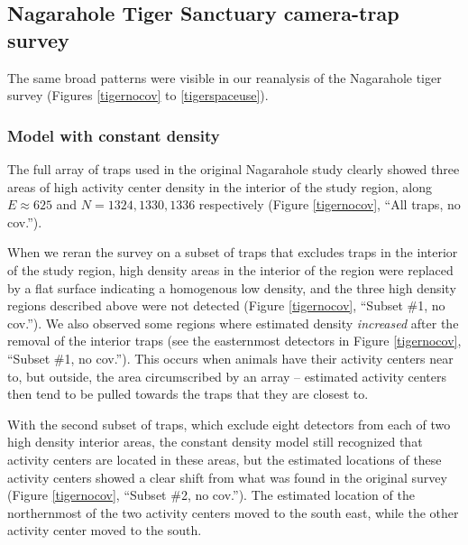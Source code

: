 \documentclass[a4paper,12pt]{article}
\begin{document}
\subsection{Nagarahole Tiger Sanctuary camera-trap survey} 
The same broad patterns were visible in our reanalysis of the Nagarahole tiger survey (Figures \ref{tigernocov} to \ref{tigerspaceuse}). 

\subsubsection{Model with constant density}
The full array of traps used in the original Nagarahole study clearly showed three areas of high activity center density in the interior of the study region, along $E\approx 625$ and $N=1324, 1330, 1336$ respectively (Figure \ref{tigernocov}, ``All traps, no cov.''). 

When we reran the survey on a subset of traps that excludes traps in the interior of the study region, high density areas in the interior of the region were replaced by a flat surface indicating a homogenous low density, and the three high density regions described above were not detected  (Figure \ref{tigernocov}, ``Subset \#1, no cov.''). We also observed some regions where estimated density {\it increased} after the removal of the interior traps (see the easternmost detectors in Figure \ref{tigernocov}, ``Subset \#1, no cov.''). This occurs when animals have their activity centers near to, but outside, the area circumscribed by an array -- estimated activity centers then tend to be pulled towards the traps that they are closest to. 

With the second subset of traps, which exclude eight detectors from each of two high density interior areas, the constant density model still recognized that activity centers are located in these areas, but the estimated locations of these activity centers showed a clear shift from what was found in the original survey (Figure \ref{tigernocov}, ``Subset \#2, no cov.''). The estimated location of the northernmost of the two activity centers moved to the south east, while the other activity center moved to the south.
\end{document}
